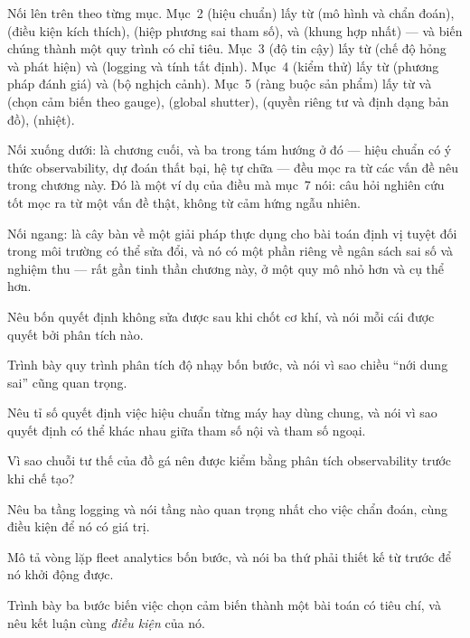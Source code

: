 \documentclass[../../vslam.tex]{subfiles}
\begin{document}
Nối lên trên theo từng mục. Mục~2 (hiệu chuẩn) lấy từ  (mô hình và chẩn đoán),  (điều kiện kích thích),  (hiệp phương sai tham số), và  (khung hợp nhất) --- và biến chúng thành một quy trình có chỉ tiêu. Mục~3 (độ tin cậy) lấy từ  (chế độ hỏng và phát hiện) và  (logging và tính tất định). Mục~4 (kiểm thử) lấy từ  (phương pháp đánh giá) và  (bộ nghịch cảnh). Mục~5 (ràng buộc sản phẩm) lấy từ  và  (chọn cảm biến theo gauge),  (global shutter),  (quyền riêng tư và định dạng bản đồ),  (nhiệt).

Nối xuống dưới:  là chương cuối, và ba trong tám hướng ở đó --- hiệu chuẩn có ý thức observability, dự đoán thất bại, hệ tự chữa --- đều mọc ra từ các vấn đề nêu trong chương này. Đó là một ví dụ của điều mà  mục~7 nói: câu hỏi nghiên cứu tốt mọc ra từ một vấn đề thật, không từ cảm hứng ngẫu nhiên.

Nối ngang:  là cây bàn về một giải pháp thực dụng cho bài toán định vị tuyệt đối trong môi trường có thể sửa đổi, và nó có một phần riêng về ngân sách sai số và nghiệm thu --- rất gần tinh thần chương này, ở một quy mô nhỏ hơn và cụ thể hơn.

\begin{tukiem}
\item Nêu bốn quyết định không sửa được sau khi chốt cơ khí, và nói mỗi cái được quyết bởi phân tích nào.
\item Trình bày quy trình phân tích độ nhạy bốn bước, và nói vì sao chiều ``nới dung sai'' cũng quan trọng.
\item Nêu tỉ số quyết định việc hiệu chuẩn từng máy hay dùng chung, và nói vì sao quyết định có thể khác nhau giữa tham số nội và tham số ngoại.
\item Vì sao chuỗi tư thế của đồ gá nên được kiểm bằng phân tích observability trước khi chế tạo?
\item Nêu ba tầng logging và nói tầng nào quan trọng nhất cho việc chẩn đoán, cùng điều kiện để nó có giá trị.
\item Mô tả vòng lặp fleet analytics bốn bước, và nói ba thứ phải thiết kế từ trước để nó khởi động được.
\item Trình bày ba bước biến việc chọn cảm biến thành một bài toán có tiêu chí, và nêu kết luận cùng \emph{điều kiện} của nó.
\end{tukiem}
\ifSubfilesClassLoaded{\printbibliography[title={Nguồn}]}{}
\end{document}
